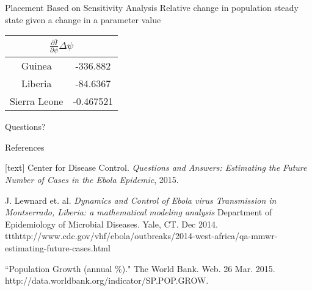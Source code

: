 \documentclass{beamer}
\begin{document}
\begin{frame}{Placement Based on Sensitivity Analysis}
Relative change in population steady state given a change in a parameter value
\begin{center}
\begin{tabular}{|c|c|}
\hline
\multicolumn{2}{|c|}{$\displaystyle\frac{\partial \bar{I}}{\partial \psi}\Delta
\psi$} \\
\hline
Guinea & -336.882 \\ \hline
Liberia & -84.6367 \\ \hline
Sierra Leone & -0.467521 \\ \hline
\end{tabular}
\end{center}
\end{frame}

{
\begin{frame}
\centering \Huge \color{white} Questions?

\end{frame}}

\begin{frame}{References}

\begin{thebibliography}{3}
[text]
\tiny
{} Center for Disease Control. \emph{Questions and Answers:
Estimating the Future Number of Cases in the Ebola Epidemic}, 2015.

J. Lewnard et. al. \emph{Dynamics and Control of Ebola virus
Transmission in Montserrado, Liberia: a mathematical modeling analysis}
Department of Epidemiology of Microbial Diseases. Yale,
CT. Dec 2014.
ttt{http://www.cdc.gov/vhf/ebola/outbreaks/2014-west-africa/qa-mmwr-estimating-future-cases.html}

 ``Population Growth (annual \%)." The World Bank. Web. 26
Mar. 2015. http://data.worldbank.org/indicator/SP.POP.GROW.


\end{thebibliography}

\end{frame}
\end{document}
